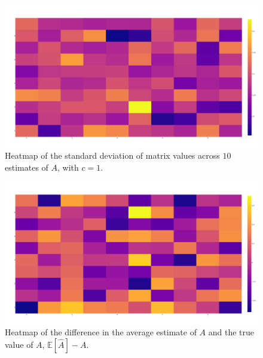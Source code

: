 \documentclass[12pt]{article}
\theoremstyle{definition}
\begin{document}
\newpage

\begin{figure}[hbt!]
    \par
    \begin{center}
    \caption{Heatmap of the standard deviation of matrix values across $10$ estimates of $A$, with $c=1$. }
    \label{fig:heatmapSD}
    \includegraphics[scale=0.1]{Figures/heatmap_sd_guesses.png}
    \end{center}
    \par
    \vspace{-0.25in}
    \medskip
\end{figure}

\vspace{-0.5in}

\begin{figure}[hbt!]
    \par
    \begin{center}
    \caption{Heatmap of the difference in the average estimate of $A$ and the true value of $A$, $\mathbb{E}[\hat{A}] - A$.}
    \label{fig:heatmapAVG}
    \includegraphics[scale=0.1]{Figures/heatmap_average_minus_true.png}
    \end{center}
    \par
    \vspace{-0.25in}
    \medskip
\end{figure}
\end{document}
